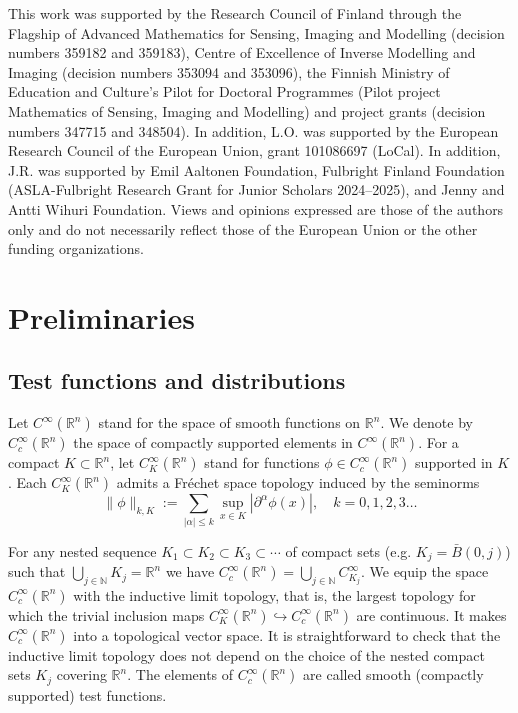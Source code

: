 \documentclass[10pt,a4paper]{article}
\theoremstyle{plain}
\theoremstyle{definition}
\theoremstyle{remark}
\numberwithin{equation}{section}
\newcommand{\R}{\mathbb{R}}
\newcommand{\N}{\mathbb{N}}
\begin{document}
This work was supported by the Research Council of Finland through the Flagship of Advanced Mathematics for Sensing, Imaging and Modelling (decision numbers 359182 and 359183), Centre of Excellence of Inverse Modelling and Imaging (decision numbers 353094 and 353096), the Finnish Ministry of Education and Culture’s Pilot for Doctoral Programmes (Pilot project Mathematics of Sensing, Imaging and Modelling) and project grants (decision numbers 347715 and 348504). In addition, L.O. was supported by the European Research Council of the European Union, grant 101086697 (LoCal). In addition, J.R. was supported by Emil Aaltonen Foundation, Fulbright Finland Foundation (ASLA-Fulbright Research Grant for Junior Scholars 2024--2025), and Jenny and Antti Wihuri Foundation. Views and opinions expressed are those of the authors only and do not necessarily reflect those of the European Union or the other funding organizations. 


\section{Preliminaries}\label{preliminaries-sec}





 

\subsection{Test functions and distributions}\label{subsection_test-functions}


Let $C^\infty(\R^n)$ stand for the space of smooth functions on $\R^n$. 
We denote by $C^\infty_c(\R^n)$ the space of compactly supported elements in $C^\infty(\R^n)$. 
For a compact $K \subset \R^n$,  let $C^\infty_K (\R^n)$ stand for functions $\phi \in C^\infty_c (\R^n)$ supported in $K$. 
Each $C_{K}^\infty( \R^n)$ admits a Fr\'echet space topology  induced by the seminorms 
\[
\| \phi \|_{k,K} := \sum_{|\alpha| \leq k} \sup_{x\in K}   | \partial^\alpha \phi(x) |, \quad k =0,1,2,3\dots
\]

For any nested sequence $K_1 \subset K_2 \subset K_3 \subset \cdots$ of compact sets (e.g. $K_j = \bar{B}(0,j)$)  such that $\bigcup_{j\in \N} K_j = \R^n$ we have $C_c^\infty ( \R^n) = \bigcup_{j \in \N} C_{K_j}^\infty$. 
We equip the space $C_c^\infty ( \R^n ) $ 
with the inductive limit topology, that is, the largest topology for which the trivial inclusion maps $ C_K^\infty  ( \R^n ) \hookrightarrow  C_c^\infty ( \R^n ) $ are continuous. 
It makes $C_c^\infty ( \R^n ) $ into a topological vector space. 
It is straightforward to check that the inductive limit topology does not depend on the choice of the nested compact sets $K_j$ covering $\R^n$. The elements of $C_c^\infty ( \R^n ) $ are called smooth (compactly supported) test functions. 
\end{document}
